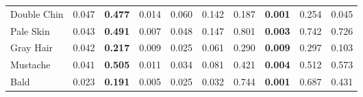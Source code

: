 \begin{tabular}{lrllrrllrr}
 Double Chin         & 0.047 & \bf 0.477 & 0.014     & 0.060 & 0.142 & 0.187     & \bf 0.001 & 0.254 & 0.045 \\
 Pale Skin           & 0.043 & \bf 0.491 & 0.007     & 0.048 & 0.147 & 0.801     & \bf 0.003 & 0.742 & 0.726 \\
 Gray Hair           & 0.042 & \bf 0.217 & 0.009     & 0.025 & 0.061 & 0.290     & \bf 0.009 & 0.297 & 0.103 \\
 Mustache            & 0.041 & \bf 0.505 & 0.011     & 0.034 & 0.081 & 0.421     & \bf 0.004 & 0.512 & 0.573 \\
 Bald                & 0.023 & \bf 0.191 & 0.005     & 0.025 & 0.032 & 0.744     & \bf 0.001 & 0.687 & 0.431 \\
\hline
\end{tabular}